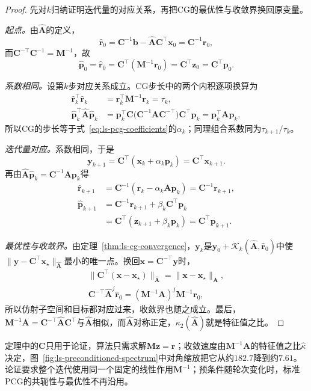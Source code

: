 \begin{proof}
先对$k$归纳证明迭代量的对应关系，再把CG的最优性与收敛界换回原变量。

\emph{起点。}由$\widehat{\bm A}$的定义，
\[
 \hat{\bm r}_0=\bm C^{-1}\bm b-\widehat{\bm A}\bm C^\top\bm x_0=\bm C^{-1}\bm r_0 ,
\]
而$\bm C^{-\top}\bm C^{-1}=\bm M^{-1}$，故
\[
 \hat{\bm p}_0=\hat{\bm r}_0=\bm C^\top(\bm M^{-1}\bm r_0)=\bm C^\top\bm z_0=\bm C^\top\bm p_0 .
\]

\emph{系数相同。}设第$k$步对应关系成立。CG步长中的两个内积逐项换算为
\[
 \begin{aligned}
 \hat{\bm r}_k^\top\hat{\bm r}_k&=\bm r_k^\top\bm M^{-1}\bm r_k=\tau_k,\\
 \hat{\bm p}_k^\top\widehat{\bm A}\hat{\bm p}_k&=\bm p_k^\top\bm C\bigl(\bm C^{-1}\bm A\bm C^{-\top}\bigr)\bm C^\top\bm p_k=\bm p_k^\top\bm A\bm p_k ,
 \end{aligned}
\]
所以CG的步长等于式~\eqref{eq:ls-pcg-coefficients}的$\alpha_k$；同理组合系数同为$\tau_{k+1}/\tau_k$。

\emph{迭代量对应。}系数相同，于是
\[
 \bm y_{k+1}=\bm C^\top(\bm x_k+\alpha_k\bm p_k)=\bm C^\top\bm x_{k+1} .
\]
再由$\widehat{\bm A}\hat{\bm p}_k=\bm C^{-1}\bm A\bm p_k$得
\[
 \begin{aligned}
 \hat{\bm r}_{k+1}&=\bm C^{-1}(\bm r_k-\alpha_k\bm A\bm p_k)=\bm C^{-1}\bm r_{k+1},\\
 \hat{\bm p}_{k+1}&=\bm C^{-1}\bm r_{k+1}+\beta_k\bm C^\top\bm p_k\\
 &=\bm C^\top(\bm z_{k+1}+\beta_k\bm p_k)=\bm C^\top\bm p_{k+1}.
 \end{aligned}
\]

\emph{最优性与收敛界。}由定理~\ref{thm:ls-cg-convergence}，$\bm y_k$是$\bm y_0+\mathcal K_k(\widehat{\bm A},\hat{\bm r}_0)$中使$\lVert\bm y-\bm C^\top\bm x_\star\rVert_{\widehat{\bm A}}$最小的唯一点。换回$\bm x=\bm C^{-\top}\bm y$时，
\[
 \begin{gathered}
 \lVert\bm C^\top(\bm x-\bm x_\star)\rVert_{\widehat{\bm A}}=\lVert\bm x-\bm x_\star\rVert_{\bm A},\\
 \bm C^{-\top}\widehat{\bm A}^j\hat{\bm r}_0=(\bm M^{-1}\bm A)^j\bm M^{-1}\bm r_0 ,
 \end{gathered}
\]
所以仿射子空间和目标都对应过来，收敛界也随之成立。最后，$\bm M^{-1}\bm A=\bm C^{-\top}\widehat{\bm A}\bm C^\top$与$\widehat{\bm A}$相似，而$\widehat{\bm A}$对称正定，$\kappa_2(\widehat{\bm A})$就是特征值之比。
\end{proof}

定理中的$\bm C$只用于论证，算法只需求解$\bm M\bm z=\bm r$；收敛速度由$\bm M^{-1}\bm A$的特征值之比$\hat\kappa$决定，图~\ref{fig:ls-preconditioned-spectrum}中对角缩放把它从约$182.7$降到约$7.61$。论证要求整个迭代使用同一个固定的线性作用$\bm M^{-1}$；预条件随轮次变化时，标准PCG的共轭性与最优性不再沿用。

